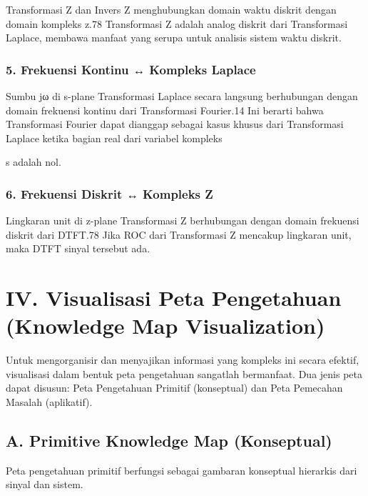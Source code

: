 \documentclass[
  letterpaper,
  DIV=11,
  numbers=noendperiod]{scrreprt}
\begin{document}
Transformasi Z dan Invers Z menghubungkan domain waktu diskrit dengan
domain kompleks z.78 Transformasi Z adalah analog diskrit dari
Transformasi Laplace, membawa manfaat yang serupa untuk analisis sistem
waktu diskrit.

\subsubsection{5. Frekuensi Kontinu ↔ Kompleks
Laplace}\label{frekuensi-kontinu-kompleks-laplace}

Sumbu jω di s-plane Transformasi Laplace secara langsung berhubungan
dengan domain frekuensi kontinu dari Transformasi Fourier.14 Ini berarti
bahwa Transformasi Fourier dapat dianggap sebagai kasus khusus dari
Transformasi Laplace ketika bagian real dari variabel kompleks

s adalah nol.

\subsubsection{6. Frekuensi Diskrit ↔ Kompleks
Z}\label{frekuensi-diskrit-kompleks-z}

Lingkaran unit di z-plane Transformasi Z berhubungan dengan domain
frekuensi diskrit dari DTFT.78 Jika ROC dari Transformasi Z mencakup
lingkaran unit, maka DTFT sinyal tersebut ada.

\section{IV. Visualisasi Peta Pengetahuan (Knowledge Map
Visualization)}\label{iv.-visualisasi-peta-pengetahuan-knowledge-map-visualization}

Untuk mengorganisir dan menyajikan informasi yang kompleks ini secara
efektif, visualisasi dalam bentuk peta pengetahuan sangatlah bermanfaat.
Dua jenis peta dapat disusun: Peta Pengetahuan Primitif (konseptual) dan
Peta Pemecahan Masalah (aplikatif).

\subsection{A. Primitive Knowledge Map
(Konseptual)}\label{a.-primitive-knowledge-map-konseptual}

Peta pengetahuan primitif berfungsi sebagai gambaran konseptual
hierarkis dari sinyal dan sistem.
\end{document}
